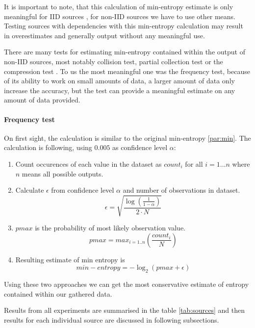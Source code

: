 \documentclass[
  print, %
  table,   %
  nolof,     %
  nolot,     %
           oneside
]{fithesis3}
\begin{document}
It is important to note, that this calculation of min-entropy estimate is only meaningful for IID sources \cite{barker2012recommendation}, for non-IID sources we have to use other means. Testing sources with dependencies with this min-entropy calculation may result in overestimates and generally output without any meaningful use.

There are many tests for estimating min-entropy contained within the output of non-IID sources, most notably collision test, partial collection test or the compression test \cite{barker2012recommendation}. To us the most meaningful one was the frequency test\cite{barker2012recommendation}, because of its ability to work on small amounts of data, a larger amount of data only increase the accuracy, but the test can provide a meaningful estimate on any amount of data provided.

\paragraph{Frequency test}\label{par:freq}
  On first sight, the calculation is similar to the original min-entropy \ref{par:min}. The calculation is following, using $0.005$ as confidence level $\alpha$:

  \begin{enumerate}
    \item Count occurences of each value in the dataset as $count_i$ for all $i=1 \dots n$ where $n$ means all possible outputs.
    \item Calculate $\epsilon$ from confidence level $\alpha$ and number of observations in dataset.
    $$\epsilon = \sqrt{\frac{\log(\frac{1}{1-\alpha})}{2\cdot N}}$$
    \item $pmax$ is the probability of most likely observation value.
    $$pmax = max_{i=1..n}(\frac{count_i}{N})$$
    \item Resulting estimate of min entropy is
    $$min-entropy =  -\log_2 (pmax + \epsilon)$$

  \end{enumerate}

  Using these two approaches we can get the most conservative estimate of entropy contained within our gathered data.

  Results from all experiments are summarised in the table \ref{tab:sources} and then results for each individual source are discussed in following subsections.
\end{document}
